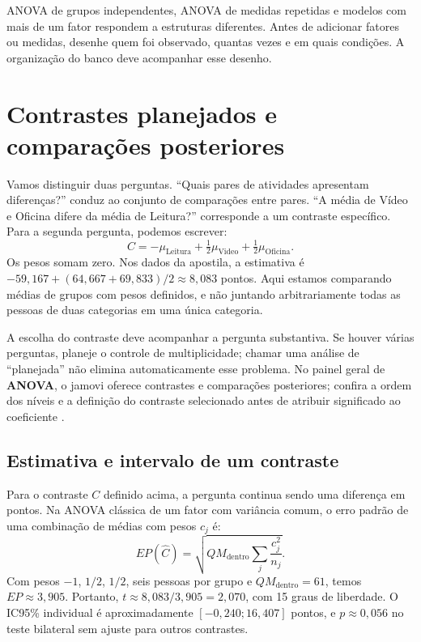 \begin{tcolorbox}[colback=white,colframe=green,title={Dica de Conteúdo}]
ANOVA de grupos independentes, ANOVA de medidas repetidas e modelos com mais de um fator respondem a estruturas diferentes. Antes de adicionar fatores ou medidas, desenhe quem foi observado, quantas vezes e em quais condições. A organização do banco deve acompanhar esse desenho.
\end{tcolorbox}

\section{Contrastes planejados e comparações posteriores}

Vamos distinguir duas perguntas. ``Quais pares de atividades apresentam diferenças?'' conduz ao conjunto de comparações entre pares. ``A média de Vídeo e Oficina difere da média de Leitura?'' corresponde a um contraste específico. Para a segunda pergunta, podemos escrever:
\[
C=-\mu_{\mathrm{Leitura}}+\tfrac12\mu_{\mathrm{Video}}+
\tfrac12\mu_{\mathrm{Oficina}}.
\]
Os pesos somam zero. Nos dados da apostila, a estimativa é $-59{,}167+(64{,}667+69{,}833)/2\approx8{,}083$ pontos. Aqui estamos comparando médias de grupos com pesos definidos, e não juntando arbitrariamente todas as pessoas de duas categorias em uma única categoria.

A escolha do contraste deve acompanhar a pergunta substantiva. Se houver várias perguntas, planeje o controle de multiplicidade; chamar uma análise de ``planejada'' não elimina automaticamente esse problema. No painel geral de \textbf{ANOVA}, o jamovi oferece contrastes e comparações posteriores; confira a ordem dos níveis e a definição do contraste selecionado antes de atribuir significado ao coeficiente \parencite{JamoviAnovaFatorial}.

\subsection{Estimativa e intervalo de um contraste}

Para o contraste $C$ definido acima, a pergunta continua sendo uma diferença em pontos. Na ANOVA clássica de um fator com variância comum, o erro padrão de uma combinação de médias com pesos $c_j$ é:
\[
EP(\widehat C)=\sqrt{QM_{\mathrm{dentro}}\sum_j\frac{c_j^2}{n_j}}.
\]
Com pesos $-1$, $1/2$, $1/2$, seis pessoas por grupo e $QM_{\mathrm{dentro}}=61$, temos $EP\approx3{,}905$. Portanto, $t\approx8{,}083/3{,}905=2{,}070$, com 15 graus de liberdade. O IC95\% individual é aproximadamente $[-0{,}240;16{,}407]$ pontos, e $p\approx0{,}056$ no teste bilateral sem ajuste para outros contrastes.

